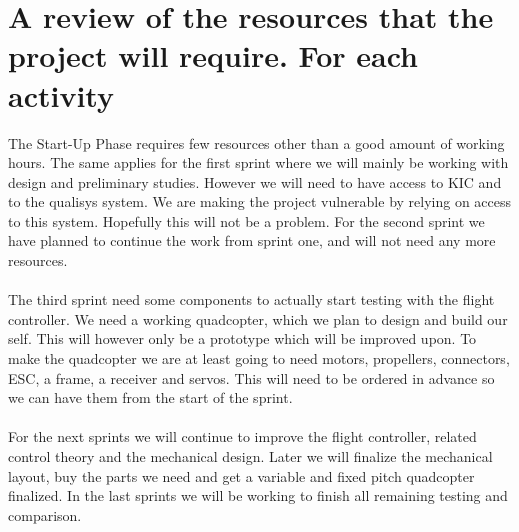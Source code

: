 \section{A review of the resources that the project will require. For each activity}

The Start-Up Phase requires few resources other than a good amount of working hours. The same applies for the first sprint where we will mainly be working with design and preliminary studies. However we will need to have access to KIC and to the qualisys system. We are making the project vulnerable by relying on access to this system. Hopefully this will not be a problem. 
For the second sprint we have planned to continue the work from sprint one, and will not need any more resources. \\
\\
The third sprint need some components to actually start testing with the flight controller. We need a working quadcopter, which we plan to design and build our self. This will however only be a prototype which will be improved upon. To make the quadcopter we are at least going to need motors, propellers, connectors, ESC, a frame, a receiver and servos. This will need to be ordered in advance so we can have them from the start of the sprint. \\
\\ 
For the next sprints we will continue to improve the flight controller, related control theory and the mechanical design. 
Later we will finalize the mechanical layout, buy the parts we need and get a variable and fixed pitch quadcopter finalized. 
In the last sprints we will be working to finish all remaining testing and comparison. 